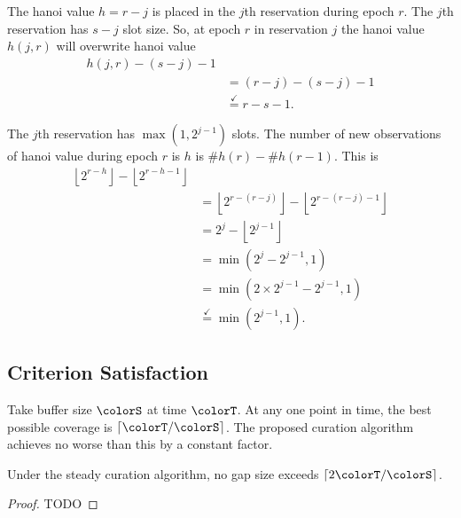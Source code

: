 The hanoi value $h = r - j$ is placed in the $j$th reservation during epoch $r$.
The $j$th reservation has $s - j$ slot size.
So, at epoch $r$ in reservation $j$ the hanoi value $h(j, r)$ will overwrite hanoi value
\begin{align*}
h(j, r) - (s - j) - 1 \\
&= (r - j) - (s - j) - 1 \\
&\stackrel{\checkmark}{=} r - s - 1.
\end{align*}

The $j$th reservation has $\max(1, 2^{j - 1})$ slots.
The number of new observations of hanoi value during epoch $r$ is $h$ is $\# h(r) -  \# h(r - 1)$.
This is
\begin{align*}
\left\lfloor 2 ^ {r - h} \right\rfloor - \left\lfloor 2 ^ {r - h - 1} \right\rfloor \\
&= \left\lfloor 2 ^{r - (r - j)} \right\rfloor - \left\lfloor 2 ^ {r - (r - j) - 1} \right\rfloor \\
&= 2^j - \left\lfloor 2 ^ {j - 1} \right\rfloor \\
&= \min(2^j - 2^{j - 1}, 1) \\
&= \min(2 \times 2^{j - 1} - 2^{j - 1}, 1) \\
&\stackrel{\checkmark}{=} \min(2^{j - 1}, 1).
\end{align*}


\subsection{Criterion Satisfaction}

Take buffer size $\colorS$ at time $\colorT$.
At any one point in time, the best possible coverage is $\left\lceil \colorT / \colorS \right\rceil$.
The proposed curation algorithm achieves no worse than this by a constant factor.

\begin{theorem}
\label{thm:steady-gap-size}
Under the steady curation algorithm, no gap size exceeds $\left\lceil 2 \colorT / \colorS \right\rceil$.  %
\end{theorem}
\begin{proof}
TODO
\end{proof}
